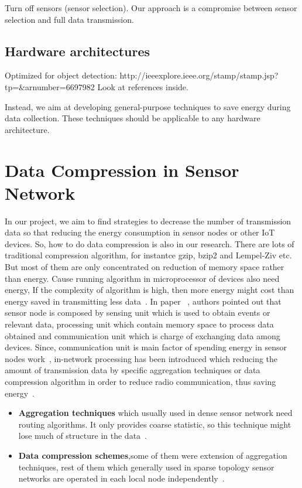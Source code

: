 \documentclass{report}
\begin{document}
Turn off sensors (sensor selection). Our approach is a compromise between sensor selection and full data transmission.

\subsection{Hardware architectures}

Optimized for object detection: http://ieeexplore.ieee.org/stamp/stamp.jsp?tp=&arnumber=6697982
Look at references inside. 

Instead, we aim at developing general-purpose techniques to save energy during data collection. These techniques should be applicable to any hardware architecture. 

\section{Data Compression in Sensor Network}
In our project, we aim to find  strategies to decrease the number of transmission data  so that reducing the energy consumption in sensor nodes or other IoT devices. So, how to do data compression is also in our research.
There are lots of traditional compression algorithm, for instantce gzip, bzip2 and Lempel-Ziv etc. But most of them are only concentrated on reduction of memory space rather than energy.  Cause running algorithm in microprocessor of devices also need energy, If the complexity of algorithm is high, then more energy might cost than energy saved in transmitting less data~\cite{barr2006energy}. In paper ~\cite{srisooksai2012practical}, authors pointed out that sensor node is composed by sensing unit which is used to obtain events or relevant data, processing unit which contain memory space to process data obtained and communication unit which  is charge of exchanging data among devices. Since, communication unit is main factor of spending energy in sensor nodes work~\cite{barr2006energy}, in-network processing has been introduced which reducing the amount of transmission data by specific aggregation techniques or data compression algorithm in order to reduce radio communication, thus saving energy~\cite{srisooksai2012practical}. 
\begin{itemize}
    \item \textbf{Aggregation techniques} which usually used in dense sensor network need routing algorithms. It only provides coarse statistic, so this technique might lose much of structure in the data~\cite{srisooksai2012practical}.
    \item \textbf{Data compression schemes},some of them were extension of aggregation techniques, rest of them which generally used in sparse topology sensor networks are operated in each local node independently~\cite{srisooksai2012practical}.
\end{itemize}
\end{document}
